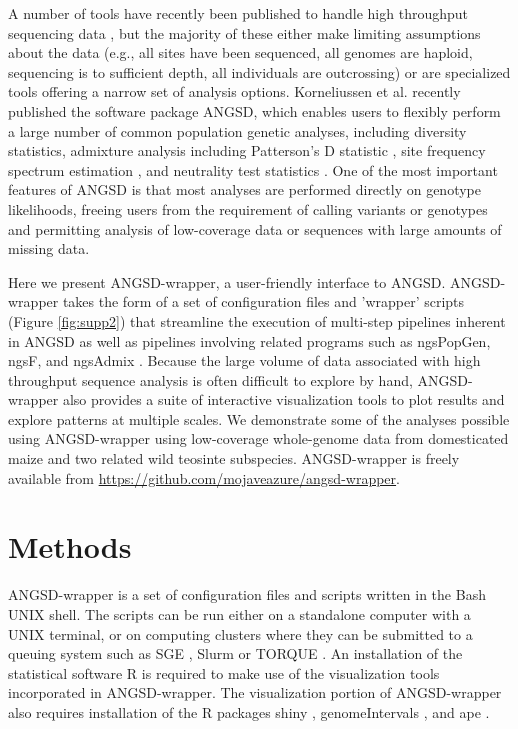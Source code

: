 \documentclass[10pt,a4paper]{article}
\newcommand{\jri}[1]{\todo[size=\scriptsize, color=flame]{#1}}
\begin{document}
A number of tools have recently been published to handle high throughput sequencing data \citep{garrigan2013popbam, purcell2007plink, danecek2011variant, hutter2006genome}, but the majority of these either make limiting assumptions about the data (e.g., all sites have been sequenced, all genomes are haploid, sequencing is to sufficient depth, all individuals are outcrossing) or are specialized tools offering a narrow set of analysis options. 
Korneliussen et al. \citep{korneliussen2014angsd} recently published the software package ANGSD, which enables users to flexibly perform a large number of common population genetic analyses, including diversity statistics, admixture analysis including Patterson's D statistic \citep{Durand:2011jd}, site frequency spectrum estimation \citep{pmid22911679}, and neutrality test statistics \citep{korneliussen_calculation_2013}. %
One of the most important features of ANGSD is that most analyses are performed directly on genotype likelihoods, freeing users from the requirement of calling variants or genotypes and permitting analysis of low-coverage data or sequences with large amounts of missing data. 

Here we present ANGSD-wrapper, a user-friendly interface to ANGSD. 
ANGSD-wrapper takes the form of a set of configuration files and 'wrapper' scripts (Figure \ref{fig:supp2}) that streamline the execution of multi-step pipelines inherent in ANGSD as well as pipelines involving related programs such as ngsPopGen, ngsF\citep{vieira2013estimating}, and ngsAdmix \citep{pmid24026093}.
Because the large volume of data associated with high throughput sequence analysis is often difficult to explore by hand, ANGSD-wrapper also provides a suite of interactive visualization tools to plot results and explore patterns at multiple scales.  
We demonstrate some of the analyses possible using ANGSD-wrapper using low-coverage whole-genome data from domesticated maize and two related wild teosinte subspecies. 
ANGSD-wrapper is freely available from \url{https://github.com/mojaveazure/angsd-wrapper}.

\section*{Methods}
ANGSD-wrapper is a set of configuration files and scripts written in the Bash UNIX shell.  
The scripts can be run either on a standalone computer with a UNIX terminal, or on computing clusters where they can be submitted to a queuing system such as SGE \citep{Microsystems):2001:SGE:560889.792378}, Slurm \citep{Jette02slurm:simple} or TORQUE \citep{Staples:2006:TRM:1188455.1188464}.  
An installation of the statistical software R \citep{Rcitation} is required to make use of the visualization tools incorporated in ANGSD-wrapper.  
The visualization portion of ANGSD-wrapper also requires installation of the R packages shiny \citep{shiny}, genomeIntervals \citep{genomeIntervals}, and ape \citep{APE}.
\end{document}
